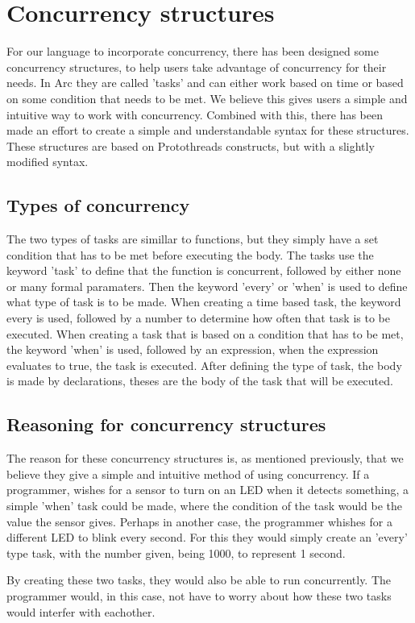 

\section{Concurrency structures}
For our language to incorporate concurrency, there has been designed some concurrency structures, to help users take advantage of concurrency for their needs. In Arc they are called 'tasks' and can either work based on time or based on some condition that needs to be met. We believe this gives users a simple and intuitive way to work with concurrency. Combined with this, there has been made an effort to create a simple and understandable syntax for these structures. These structures are based on Protothreads constructs, but with a slightly modified syntax. 

\subsection{Types of concurrency}
The two types of tasks are simillar to functions, but they simply have a set condition that has to be met before executing the body. The tasks use the keyword 'task' to define that the function is concurrent, followed by either none or many formal paramaters. Then the keyword 'every' or 'when' is used to define what type of task is to be made. When creating a time based task, the keyword every is used, followed by a number to determine how often that task is to be executed. When creating a task that is based on a condition that has to be met, the keyword 'when' is used, followed by an expression, when the expression evaluates to true, the task is executed. After defining the type of task, the body is made by declarations, theses are the body of the task that will be executed. 

\subsection{Reasoning for concurrency structures}
The reason for these concurrency structures is, as mentioned previously, that we believe they give a simple and intuitive method of using concurrency. If a programmer, wishes for a sensor to turn on an LED when it detects something, a simple 'when' task could be made, where the condition of the task would be the value the sensor gives. Perhaps in another case, the programmer whishes for a different LED to blink every second. For this they would simply create an 'every' type task, with the number given, being 1000, to represent 1 second.

By creating these two tasks, they would also be able to run concurrently. The programmer would, in this case, not have to worry about how these two tasks would interfer with eachother.

